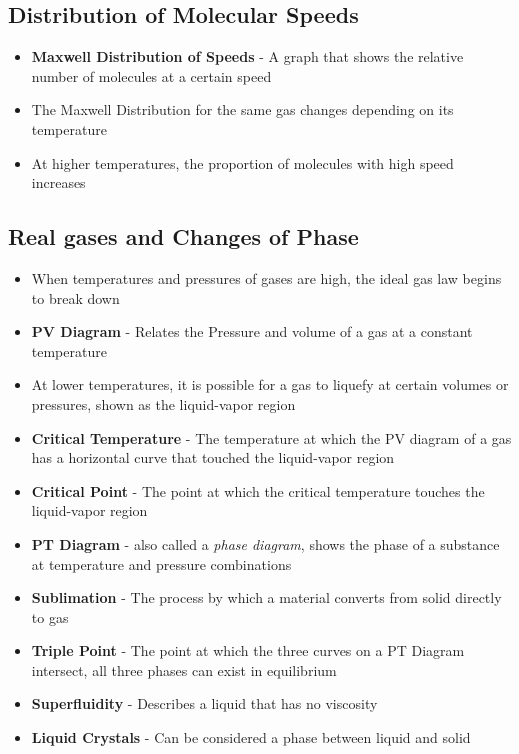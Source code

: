 \subsection{Distribution of Molecular Speeds}
\begin{itemize}
    \item \textbf{Maxwell Distribution of Speeds} - A graph that shows the relative number of molecules at a certain speed
    \item The Maxwell Distribution for the same gas changes depending on its temperature
    \item At higher temperatures, the proportion of molecules with high speed increases
\end{itemize}

\subsection{Real gases and Changes of Phase}
\begin{itemize}
    \item When temperatures and pressures of gases are high, the ideal gas law begins to break down
    \item \textbf{PV Diagram} - Relates the Pressure and volume of a gas at a constant temperature
    \item At lower temperatures, it is possible for a gas to liquefy at certain volumes or pressures, shown as the liquid-vapor region
    \item \textbf{Critical Temperature} - The temperature at which the PV diagram of a gas has a horizontal curve that touched the liquid-vapor region
    \item \textbf{Critical Point} - The point at which the critical temperature touches the liquid-vapor region
    \item \textbf{PT Diagram} - also called a \emph{phase diagram}, shows the phase of a substance at temperature and pressure combinations
    \item \textbf{Sublimation} - The process by which a material converts from solid directly to gas
    \item \textbf{Triple Point} - The point at which the three curves on a PT Diagram intersect, all three phases can exist in equilibrium
    \item \textbf{Superfluidity} - Describes a liquid that has no viscosity
    \item \textbf{Liquid Crystals} - Can be considered a phase between liquid and solid
\end{itemize}

